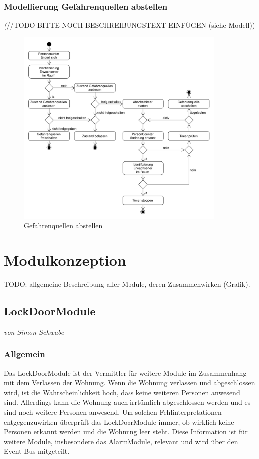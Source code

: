 \subsubsection{Modellierung Gefahrenquellen abstellen}
\emph(//TODO BITTE NOCH BESCHREIBUNGSTEXT EINFÜGEN (siehe Modell))
\begin{figure}[h!]
	\centering
	\includegraphics[width=0.9\textwidth]{img/Szenarien/GefahrenquellenAbstellen.pdf}
	\caption{Gefahrenquellen abstellen}
	\label{fig:szenarienGefahrenquellenAbstellen}
\end{figure}


\section{Modulkonzeption}
TODO: allgemeine Beschreibung aller Module, deren Zusammenwirken (Grafik).

\subsection{LockDoorModule}
\emph{von Simon Schwabe}

\subsubsection{Allgemein}
Das LockDoorModule ist der Vermittler für weitere Module im Zusammenhang mit dem Verlassen der Wohnung. Wenn die Wohnung verlassen und abgeschlossen wird, ist die Wahrscheinlichkeit hoch, dass keine weiteren Personen anwesend sind. Allerdings kann die Wohnung auch irrtümlich abgeschlossen werden und es sind noch weitere Personen anwesend. Um solchen Fehlinterpretationen entgegenzuwirken überprüft das LockDoorModule immer, ob wirklich keine Personen erkannt werden und die Wohnung leer steht. Diese Information ist für weitere Module, insbesondere das AlarmModule, relevant und wird über den Event Bus mitgeteilt.

